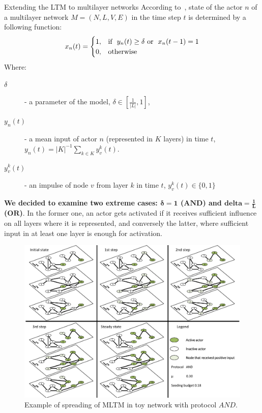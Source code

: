 \documentclass[final]{beamer}
\newlength{\colwidth}
\begin{document}
\begin{frame}[t]
\begin{columns}[t]
\begin{column}{\colwidth}
\begin{alertblock}{Extending the LTM to multilayer networks}
    \label{def:proto}
        According to~\cite{zhong2022mltm}, state of the actor $n$ of a multilayer network $M = (N, L, V, E)$ in the time step $t$ is determined
        by a following function: 
        \begin{equation*}
            x_{n}(t) =
            \begin{cases}
              1,  & \text{if \space} y_{n}(t) \geq \delta \text{\space or 
                \space} x_{n}(t-1) = 1 \\
              0,  & \text{otherwise}
            \end{cases} 
        \end{equation*}
        Where:
        \begin{description}
            \item[$\delta$] - a parameter of the model, $\delta \in [\frac{1}{|L|}, 1]$,
            \item[$y_{n}(t)$] - a mean input of actor $n$ (represented in $K$ layers) in time $t$, $y_{n}(t) = |K|^{-1} \sum_{k \in K} y_{v}^{k}(t)$.
            \item[$y_{v}^{k}(t)$] - an impulse of node $v$ from layer $k$ in time $t$, $y_{v}^{k}(t) \in \{0, 1\}$
        \end{description}

    \textbf{We decided to examine two extreme cases: $\mathbf{\delta = 1}$ ($\mathbf{AND}$) and $\mathbf{delta = \frac{1}{L}}$ ($\mathbf{OR}$)}. In the former one, an actor gets activated if it receives sufficient influence on all layers where it is represented, and conversely the latter, where sufficient input in at least one layer is enough for activation.
    \begin{figure}
        \centering
        \includegraphics[width=1\linewidth]{figures/ltm_example.pdf}
        \caption{Example of spreading of MLTM in toy network with protocol $AND$.}
        \label{fig:ltm_example_and}
    \end{figure}
\end{alertblock}


\end{column}
\end{columns}
\end{frame}
\end{document}
